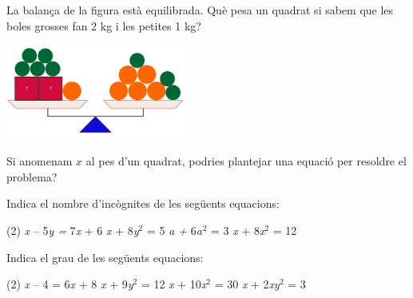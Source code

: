 \begin{mylist}




\exer  La balança de la figura està equilibrada. Què pesa un quadrat si sabem que les boles grosses fan 2 kg i les petites 1 kg?

\begin{center}
\includegraphics[width=6cm]{img-06/balanza02}
\end{center}

Si anomenam $x$ al pes d'un quadrat, podries plantejar una equació per resoldre el problema?

\exer \mental Indica el nombre d'incògnites de les següents equacions:
\begin{tasks}(2) 
	 \textit{x} -- 5\textit{y =} 7\textit{x} + 6  
	\textit{x }+ 8\textit{y${}^{2}$ }= 5  
	\textit{a + }6\textit{a${}^{ }$}${}^{2}$ = 3  
	\textit{x }+ 8\textit{x${}^{2}$ }= 12
\end{tasks}


\exer \mental  Indica el grau de les següents equacions:

\begin{tasks}(2)
	\textit{x} -- 4 = 6\textit{x} + 8   
	\textit{x} + 9\textit{y${}^{2}$ }= 12  
	\textit{x} + 10\textit{x${}^{2}$ }= 30  
	\textit{x} + 2\textit{xy${}^{2}$ }= 3
\end{tasks}


\end{mylist}



